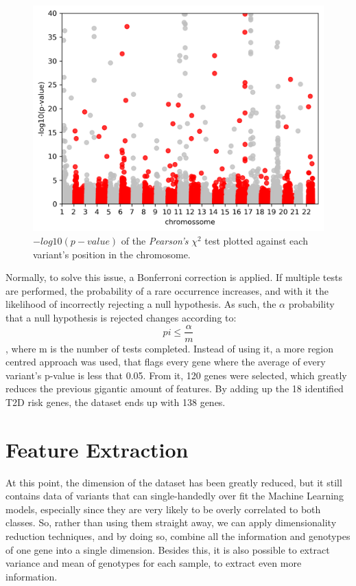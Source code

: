 \begin{figure}[h]
	\centering
	\includegraphics[width=\textwidth]{../images/feature_extraction/manhattan.png}
	\caption{$-log10(p-value)$ of the \textit{Pearson's} $\chi^2$ test plotted against each variant's position in the chromosome.} 
	\label{fig:chi}
\end{figure}

Normally, to solve this issue, a Bonferroni correction is applied. If multiple tests are performed, the probability of a rare occurrence increases, and with it the likelihood of incorrectly rejecting a null hypothesis. As such, the $\alpha$ probability that a null hypothesis is rejected changes according to:
\begin{equation}
pi \leq \frac{\alpha}{m}
\end{equation}
, where m is the number of tests completed. Instead of using it, a more region centred approach was used, that flags every gene where the average of every variant's p-value is less that 0.05. From it, 120 genes were selected, which greatly reduces the previous gigantic amount of features. By adding up the 18 identified \gls{T2D} risk genes, the dataset ends up with 138 genes. 

\section{Feature Extraction}

At this point, the dimension of the dataset has been greatly reduced, but it still contains data of variants that can single-handedly over fit the Machine Learning models, especially since they are very likely to be overly correlated to both classes. So, rather than using them straight away, we can apply dimensionality reduction techniques, and by doing so, combine all the information and genotypes of one gene into a single dimension. Besides this, it is also possible to extract variance and mean of genotypes for each sample, to extract even more information.

